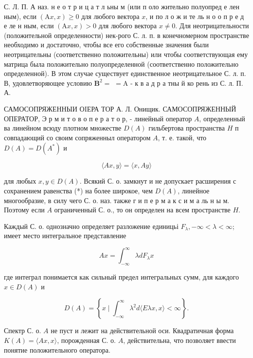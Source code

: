 \documentclass[10pt]{article}
\begin{document}
С. Л. П. А наз. н е о т р и ц а т л ьны м (или п оло жительно полуопред е лен ным), если $(\mathrm{A} x, x) \geqslant 0$ для любого вектора $x$, и по л о ж и те ль н о о п р е д е ле н ным, если $(\mathrm{A} x, x)>0$ для любого вектора $x \neq 0$. Для неотрицательности (положительной определенности) нек-рого С. л. п. в конечномерном пространстве необходимо и достаточно, чтобы все его собственные значения были неотрицательны (соответственно положительны) или чтобы соответствующая ему матрица была положительно полуопределенной (соответственно положительно определенной). В этом случае существует единственное неотрицательное С. л. п. В, удовлетворяющее условию $\mathbf{B}^{2}=$ $=\mathrm{A}$ - к в а д р а тны й ко рень из С. л. П. А.



САМОСОПРЯЖЕННЫИ ОIЕРА ТОР А. Л. Онищик. САМОСОПРЯЖЕННЫЙ ОПЕРАТОР, Э р м и т о в о п е р а т о р, - линейный оператор $A$, определенный ва линейном всюду плотном множестве $D(A)$ гильбертова пространства $H$ п совпадающий со своим сопряженныл оператором $A$, т. е. такой, что $D(A)=D\left(A^{*}\right)$ и



\[

\langle A x, y\rangle=\langle x, A y\rangle

\]



для любых $x, y \in D(A)$. Всякий С. о. замкнут и не допускает расширения с сохранением равенства (*) на более широкое, чем $D(A)$, линейное многообразие, в силу чего С. о. наз. также г и п е р м а к с и м а ль н ы м. Поэтому если $A$ ограниченный С. о., то он определен на всем пространстве $H$.



Каждый С. о. однозначно определяет разложение единицьі $F_{\lambda},-\infty<\lambda<\infty$; имеет место интегральное представление



\[

A x=\int_{-\infty}^{\infty} \lambda d F_{\lambda} x

\]



где интеграл понимается как сильный предел интегральных сумм, для каждого $x \in D(A)$ и



\[

D(A)=\left\{x \mid \int_{-\infty}^{\infty} \lambda^{2} d\langle E \lambda x, x\rangle<\infty\right\} .

\]



Спектр С. о. $A$ не пуст и лежит на действительной оси. Квадратичная форма $K(A)=\langle A x, x\rangle$, порожденная С. о. $A$, действительна, что позволяет ввести понятие положительного оператора.
\end{document}

